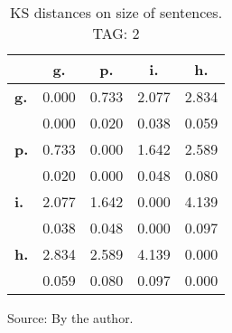 \begin{table}[h!]
\begin{center}
\caption{KS distances on size of sentences. TAG: 2}
\begin{tabular}{| l || c | c | c | c |}\hline
 & {\bf g.} & {\bf p.} & {\bf i.} & {\bf h.} \\\hline\hline
{\bf g.} & 0.000 & 0.733 & 2.077 & 2.834 \\
{\bf } & 0.000 & 0.020 & 0.038 & 0.059 \\\hline
{\bf p.} & 0.733 & 0.000 & 1.642 & 2.589 \\
{\bf } & 0.020 & 0.000 & 0.048 & 0.080 \\\hline
{\bf i.} & 2.077 & 1.642 & 0.000 & 4.139 \\
{\bf } & 0.038 & 0.048 & 0.000 & 0.097 \\\hline
{\bf h.} & 2.834 & 2.589 & 4.139 & 0.000 \\
{\bf } & 0.059 & 0.080 & 0.097 & 0.000 \\\hline
\end{tabular}
\begin{flushleft}\footnotesize
		Source: By the author.\
\end{flushleft}
\end{center}
\end{table}
